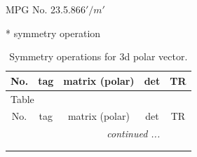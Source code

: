 \documentclass[fleqn,8pt]{jsarticle}
\begin{document}
\setcounter{MaxMatrixCols}{32}

\renewcommand{\tablename}{Table~}
\renewcommand{\figurename}{Figure~}
\begin{center}
\LARGE
MPG No. 23.5.86\quad$6'/m'$
\end{center}
* symmetry operation
\renewcommand{\arraystretch}{1.3}
\begin{longtable}{ccccc}
\caption{Symmetry operations for 3d polar vector.}
 \\
 \hline \hline
No. & tag & matrix (polar) & det & TR \\ \hline \endfirsthead

\multicolumn{4}{l}{\tablename\ \thetable{}} \\
 \hline \hline
No. & tag & matrix (polar) & det & TR \\ \hline \endhead

 \hline \hline
\multicolumn{4}{r}{\footnotesize\it continued ...} \\ \endfoot

 \hline \hline
\multicolumn{4}{r}{} \\ \endlastfoot


\end{longtable}
\end{document}

